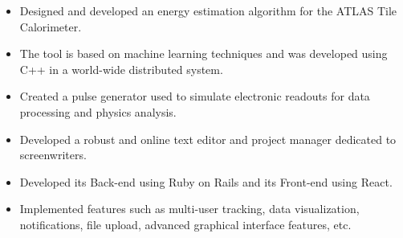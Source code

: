 \documentclass[10pt,a4paper,ragged2e]{altacv}
\begin{document}

\begin{fullwidth}
\makecvheader
\end{fullwidth}



\begin{itemize}
\item Designed and developed an energy estimation algorithm for the ATLAS Tile Calorimeter.
\item The tool is based on machine learning techniques and was developed using C++ in a world-wide distributed system.
\item Created a pulse generator used to simulate electronic readouts for data processing and physics analysis.
\end{itemize}

\divider

\begin{itemize}
\item Developed a robust and online text editor and project manager dedicated to screenwriters.
\item Developed its Back-end using Ruby on Rails and its Front-end using React.
\item Implemented features such as multi-user tracking, data visualization, notifications, file upload, advanced graphical interface features, etc.
\end{itemize}
\end{document}
